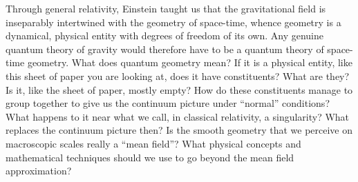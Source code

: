 Through general relativity, Einstein taught us that the gravitational
field is inseparably intertwined with the geometry of space-time, whence
geometry is a dynamical, physical entity with degrees of freedom of its
own. Any genuine quantum theory of gravity would therefore have to be a
quantum theory of space-time geometry. What does quantum geometry mean?
If it is a physical entity, like this sheet of paper you are looking
at, does it have constituents? What are they? Is it, like the sheet
of paper, mostly empty? How do these constituents manage to group together
to give us the continuum picture under ``normal'' conditions? What happens
to it near what we call, in classical relativity, a singularity? What
replaces the continuum picture then? Is the smooth geometry that we perceive
on macroscopic scales really a ``mean field''? What physical concepts and
mathematical techniques should we use to go beyond the mean field
approximation?

